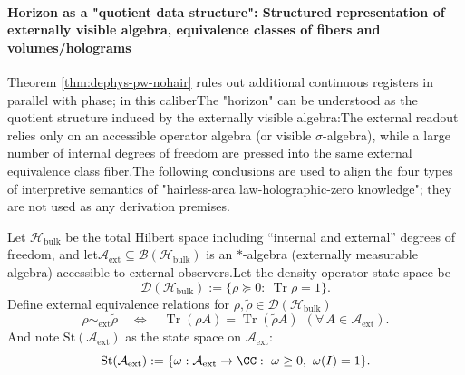 \paragraph{Horizon as a "quotient data structure": Structured representation of externally visible algebra, equivalence classes of fibers and volumes/holograms}Theorem \ref{thm:dephys-pw-nohair} rules out additional continuous registers in parallel with phase; in this caliberThe "horizon" can be understood as the quotient structure induced by the externally visible algebra:The external readout relies only on an accessible operator algebra (or visible \(\sigma\)-algebra), while a large number of internal degrees of freedom are pressed into the same external equivalence class fiber.The following conclusions are used to align the four types of interpretive semantics of "hairless-area law-holographic-zero knowledge"; they are not used as any derivation premises.
\begin{definition}\label{def:dephys-ext-observable-algebra-equivalence}Let \(\mathcal{H}_{\mathrm{bulk}}\) be the total Hilbert space including “internal and external” degrees of freedom, and let\(\mathcal{A}_{\mathrm{ext}}\subseteq \mathcal{B}(\mathcal{H}_{\mathrm{bulk}})\)
is an \(\ast\)-algebra (externally measurable algebra) accessible to external observers.Let the density operator state space be\[
\mathcal{D}(\mathcal{H}_{\mathrm{bulk}})
:=\{\rho\succeq 0:\ \operatorname{Tr}\rho=1\}.
\]
Define external equivalence relations for \(\rho,\tilde\rho\in\mathcal{D}(\mathcal{H}_{\mathrm{bulk}})\)\begin{equation}\label{eq:dephys-ext-equivalence}
\boxed{\;
\rho\sim_{\mathrm{ext}}\tilde\rho
\quad\Longleftrightarrow\quad
\operatorname{Tr}(\rho A)=\operatorname{Tr}(\tilde\rho A)\ \ (\forall\,A\in\mathcal{A}_{\mathrm{ext}}).\;}
\end{equation}
And note \(\mathrm{St}(\mathcal{A}_{\mathrm{ext}})\) as the state space on \(\mathcal{A}_{\mathrm{ext}}\):\[
\mathrm{St}(\mathcal{A}_{\mathrm{ext}})
:=\{\omega:\mathcal{A}_{\mathrm{ext}}\to\CC:\ \omega\ge 0,\ \omega(I)=1\}.
\]
\end{definition}

